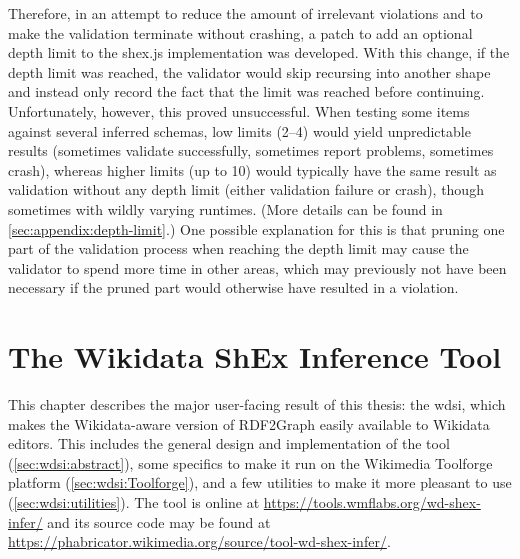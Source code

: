 Therefore, %
in an attempt to reduce the amount of irrelevant violations
and to make the validation terminate without crashing,
a patch to add an optional depth limit to the shex.js implementation was developed.
With this change, if the depth limit was reached,
the validator would skip recursing into another \gls{shape}
and instead only record the fact that the limit was reached before continuing.
Unfortunately, however, this proved unsuccessful.
When testing some \glspl{item} against several inferred schemas,
low limits (2–4) would yield unpredictable results
(sometimes validate successfully, sometimes report problems, sometimes crash),
whereas higher limits (up to 10) would typically have the same result as validation without any depth limit
(either validation failure or crash),
though sometimes with wildly varying runtimes.
(More details can be found in \cref{sec:appendix:depth-limit}.)
One possible explanation for this is that pruning one part of the validation process when reaching the depth limit
may cause the validator to spend more time in other areas,
which may previously not have been necessary if the pruned part would otherwise have resulted in a violation.


\chapter{The Wikidata ShEx Inference Tool}
\label{ch:wdsi}

This chapter describes the major user-facing result of this thesis:
the \gls{wdsi},
which makes the \gls{Wikidata}-aware %
version of \gls{RDF2Graph} easily available to \gls{Wikidata} editors.
This includes the general design and implementation of the tool (\cref{sec:wdsi:abstract}),
some specifics to make it run on the Wikimedia Toolforge platform (\cref{sec:wdsi:Toolforge}),
and a few utilities to make it more pleasant to use (\cref{sec:wdsi:utilities}).
The tool is online at \url{https://tools.wmflabs.org/wd-shex-infer/}
and its source code may be found at \url{https://phabricator.wikimedia.org/source/tool-wd-shex-infer/}.

